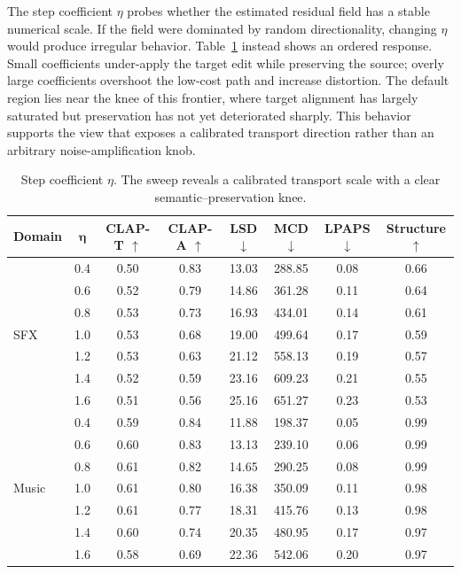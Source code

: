 The step coefficient $\eta$ probes whether the estimated residual field has a stable numerical scale.
If the field were dominated by random directionality, changing $\eta$ would produce irregular behavior.
Table~\ref{tab:eta_app} instead shows an ordered response.
Small coefficients under-apply the target edit while preserving the source; overly large coefficients overshoot the low-cost path and increase distortion.
The default region lies near the knee of this frontier, where target alignment has largely saturated but preservation has not yet deteriorated sharply.
This behavior supports the view that \methodplus exposes a calibrated transport direction rather than an arbitrary noise-amplification knob.

\begin{table}[htpb]
    \centering
    \small
    \setlength{\tabcolsep}{4.5pt}
    \begin{tabular}{lccccccc}
        \toprule
        \textbf{Domain} & $\boldsymbol{\eta}$ & \textbf{CLAP-T} $\uparrow$ & \textbf{CLAP-A} $\uparrow$ & \textbf{LSD} $\downarrow$ & \textbf{MCD} $\downarrow$ & \textbf{LPAPS} $\downarrow$ & \textbf{Structure} $\uparrow$ \\
        \midrule
        \multirow{7}{*}{SFX} & 0.4 & 0.50 & 0.83 & 13.03 & 288.85 & 0.08 & 0.66 \\
        & 0.6 & 0.52 & 0.79 & 14.86 & 361.28 & 0.11 & 0.64 \\
        & 0.8 & 0.53 & 0.73 & 16.93 & 434.01 & 0.14 & 0.61 \\
        & 1.0 & 0.53 & 0.68 & 19.00 & 499.64 & 0.17 & 0.59 \\
        & 1.2 & 0.53 & 0.63 & 21.12 & 558.13 & 0.19 & 0.57 \\
        & 1.4 & 0.52 & 0.59 & 23.16 & 609.23 & 0.21 & 0.55 \\
        & 1.6 & 0.51 & 0.56 & 25.16 & 651.27 & 0.23 & 0.53 \\
        \midrule
        \multirow{7}{*}{Music} & 0.4 & 0.59 & 0.84 & 11.88 & 198.37 & 0.05 & 0.99 \\
        & 0.6 & 0.60 & 0.83 & 13.13 & 239.10 & 0.06 & 0.99 \\
        & 0.8 & 0.61 & 0.82 & 14.65 & 290.25 & 0.08 & 0.99 \\
        & 1.0 & 0.61 & 0.80 & 16.38 & 350.09 & 0.11 & 0.98 \\
        & 1.2 & 0.61 & 0.77 & 18.31 & 415.76 & 0.13 & 0.98 \\
        & 1.4 & 0.60 & 0.74 & 20.35 & 480.95 & 0.17 & 0.97 \\
        & 1.6 & 0.58 & 0.69 & 22.36 & 542.06 & 0.20 & 0.97 \\
        \bottomrule
    \end{tabular}
    \caption{Step coefficient $\eta$. The sweep reveals a calibrated transport scale with a clear semantic--preservation knee.}
    \label{tab:eta_app}
\end{table}

